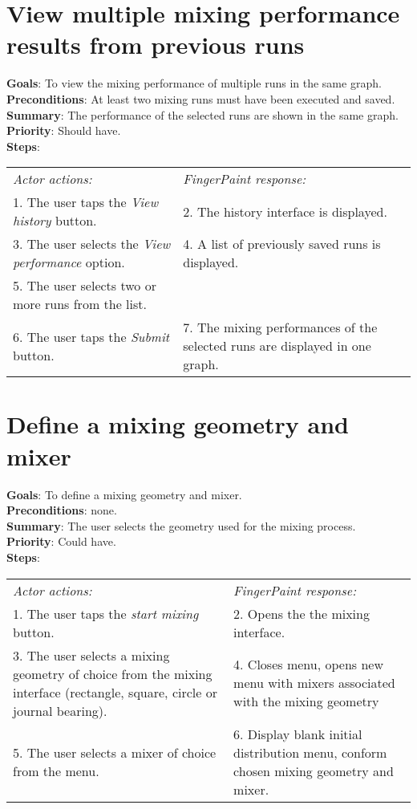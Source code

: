 \begin{appendices}
    \section{View multiple mixing performance results from previous runs}
  \label{viewmulruns}
  \textbf{Goals}: To view the mixing performance of multiple runs in the same graph.\\
  \textbf{Preconditions}: At least two mixing runs must have been executed and saved.\\
  \textbf{Summary}: The performance of the selected runs are shown in the same graph.\\
  \textbf{Priority}: Should have.\\
  \textbf{Steps}: \\
  \begin{tabular}{ p{} p{} }
  	\emph{Actor actions:} & \emph{FingerPaint response:} \\
	   1. The user taps the \emph{View history} button. & 2. The history interface is displayed. \\
	 3. The user selects the \emph{View performance} option. & 4. A list of previously saved runs is displayed.\\
	 5. The user selects two or more runs from the list. & \\
	 6. The user taps the \emph{Submit} button. & 7. The mixing performances of the selected runs are displayed in one graph.\\
  \end{tabular}

\section{Define a mixing geometry and mixer}
  \label{geomixer}
  \textbf{Goals}: To define a mixing geometry and mixer.\\
  \textbf{Preconditions}: none.\\
  \textbf{Summary}: The user selects the geometry used for the mixing process.\\
  \textbf{Priority}: Could have.\\
  \textbf{Steps}: \\
  \begin{tabular}{ p{} p{} }
  	\emph{Actor actions:} & \emph{FingerPaint response:} \\
	1. The user taps the \emph{start mixing} button. & 2. Opens the the mixing interface. \\
	3. The user selects a mixing geometry of choice from the mixing interface (rectangle, square, circle or journal bearing). & 4. Closes menu, opens new menu with mixers associated with the mixing geometry\\
	5. The user selects a mixer of choice from the menu. & 6.	Display blank initial distribution menu, conform chosen mixing geometry and mixer.\\
  \end{tabular}


\end{appendices}
